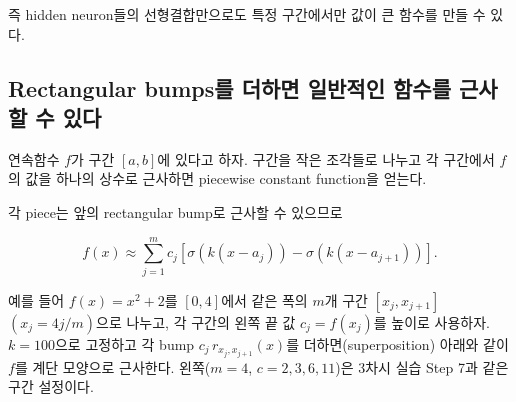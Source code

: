 \documentclass[11pt,a4paper]{article}
\newcommand{\sigmoid}{\sigma}
\begin{document}
즉 hidden neuron들의 선형결합만으로도
특정 구간에서만 값이 큰 함수를 만들 수 있다.

\subsection{Rectangular bumps를 더하면 일반적인 함수를 근사할 수 있다}

연속함수 $f$가 구간 $[a,b]$에 있다고 하자.
구간을 작은 조각들로 나누고 각 구간에서 $f$의 값을 하나의 상수로 근사하면
piecewise constant function을 얻는다.

각 piece는 앞의 rectangular bump로 근사할 수 있으므로

\[
f(x)
\approx
\sum_{j=1}^{m}
c_j
\left[
\sigmoid(k(x-a_j))
-
\sigmoid(k(x-a_{j+1}))
\right].
\]

예를 들어 $f(x)=x^2+2$를 $[0,4]$에서 같은 폭의 $m$개 구간
$[x_j,x_{j+1}]$ $(x_j=4j/m)$으로 나누고,
각 구간의 왼쪽 끝 값 $c_j=f(x_j)$를 높이로 사용하자.
$k=100$으로 고정하고 각 bump $c_j\,r_{x_j,x_{j+1}}(x)$를 더하면(superposition)
아래와 같이 $f$를 계단 모양으로 근사한다.
왼쪽($m=4$, $c=2,3,6,11$)은 3차시 실습 Step 7과 같은 구간 설정이다.
\end{document}

